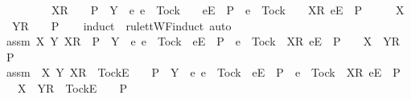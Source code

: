 \begin{isabellebody}
\ \ \ \ \ \ \ {\isasymrho}\ {\isacharat}\ {\isacharbrackleft}X{\isacharbrackright}\isactrlsub R\ {\isacharhash}\ {\isasymsigma}\ {\isasymin}\ P\ {\isasymLongrightarrow}\ Y\ {\isasyminter}\ {\isacharbraceleft}e{\isachardot}\ e\ {\isasymnoteq}\ Tock\ {\isasymand}\ {\isasymrho}\ {\isacharat}\ {\isacharbrackleft}{\isacharbrackleft}e{\isacharbrackright}\isactrlsub E{\isacharbrackright}\ {\isasymin}\ P\ {\isasymor}\ e\ {\isacharequal}\ Tock\ {\isasymand}\ {\isasymrho}\ {\isacharat}\ {\isacharbrackleft}{\isacharbrackleft}X{\isacharbrackright}\isactrlsub R{\isacharcomma}\ {\isacharbrackleft}e{\isacharbrackright}\isactrlsub E{\isacharbrackright}\ {\isasymin}\ P{\isacharbraceright}\ {\isacharequal}\ {\isacharbraceleft}{\isacharbraceright}\ {\isasymLongrightarrow}\ {\isasymrho}\ {\isacharat}\ {\isacharbrackleft}X\ {\isasymunion}\ Y{\isacharbrackright}\isactrlsub R\ {\isacharhash}\ {\isasymsigma}\ {\isasymin}\ P{\isachardoublequoteclose}\isanewline
\ \ \isamarkupfalse%
\ {\isacharparenleft}induct\ {\isasymrho}\ rule{\isacharcolon}ttWF{\isachardot}induct{\isacharcomma}\ auto{\isacharparenright}\isanewline
\ \ \ \ \isamarkupfalse%
\ assm{}{\isacharcolon}\ {\isachardoublequoteopen}{\isasymAnd}X\ Y{\isachardot}\ {\isacharbrackleft}{\isacharbrackleft}X{\isacharbrackright}\isactrlsub R{\isacharbrackright}\ {\isasymin}\ P\ {\isasymand}\ Y\ {\isasyminter}\ {\isacharbraceleft}e{\isachardot}\ e\ {\isasymnoteq}\ Tock\ {\isasymand}\ {\isacharbrackleft}{\isacharbrackleft}e{\isacharbrackright}\isactrlsub E{\isacharbrackright}\ {\isasymin}\ P\ {\isasymor}\ e\ {\isacharequal}\ Tock\ {\isasymand}\ {\isacharbrackleft}{\isacharbrackleft}X{\isacharbrackright}\isactrlsub R{\isacharcomma}\ {\isacharbrackleft}e{\isacharbrackright}\isactrlsub E{\isacharbrackright}\ {\isasymin}\ P{\isacharbraceright}\ {\isacharequal}\ {\isacharbraceleft}{\isacharbraceright}\ {\isasymLongrightarrow}\ {\isacharbrackleft}{\isacharbrackleft}X\ {\isasymunion}\ Y{\isacharbrackright}\isactrlsub R{\isacharbrackright}\ {\isasymin}\ P{\isachardoublequoteclose}\isanewline
\ \ \ \ \isamarkupfalse%
\ assm{}{\isacharcolon}\ {\isachardoublequoteopen}{\isasymAnd}{\isasymsigma}\ X\ Y{\isachardot}\ {\isacharbrackleft}X{\isacharbrackright}\isactrlsub R\ {\isacharhash}\ {\isacharbrackleft}Tock{\isacharbrackright}\isactrlsub E\ {\isacharhash}\ {\isasymsigma}\ {\isasymin}\ P\ {\isasymand}\ Y\ {\isasyminter}\ {\isacharbraceleft}e{\isachardot}\ e\ {\isasymnoteq}\ Tock\ {\isasymand}\ {\isacharbrackleft}{\isacharbrackleft}e{\isacharbrackright}\isactrlsub E{\isacharbrackright}\ {\isasymin}\ P\ {\isasymor}\ e\ {\isacharequal}\ Tock\ {\isasymand}\ {\isacharbrackleft}{\isacharbrackleft}X{\isacharbrackright}\isactrlsub R{\isacharcomma}\ {\isacharbrackleft}e{\isacharbrackright}\isactrlsub E{\isacharbrackright}\ {\isasymin}\ P{\isacharbraceright}\ {\isacharequal}\ {\isacharbraceleft}{\isacharbraceright}\ {\isasymLongrightarrow}\ {\isacharbrackleft}X\ {\isasymunion}\ Y{\isacharbrackright}\isactrlsub R\ {\isacharhash}\ {\isacharbrackleft}Tock{\isacharbrackright}\isactrlsub E\ {\isacharhash}\ {\isasymsigma}\ {\isasymin}\ P{\isachardoublequoteclose}\isanewline

\end{isabellebody}
